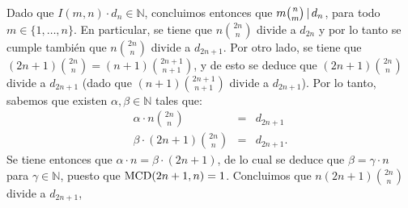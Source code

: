 		Dado que $I(m,n)\cdot d_n\in \mathbb{N}$, concluimos entonces que $m{n\choose m}\hspace{1.8pt}|\hspace{1.8pt}  d_n$, para todo $m \in \{1, \ldots, n\}$.
		En particular, se tiene que $n{2n\choose n}$ divide a $d_{2n}$ y por lo tanto se cumple también que $n{2n\choose n}$ divide a $d_{2n+1}$.
		Por otro lado, se tiene que $(2n+1){2n\choose n}=(n+1){2n+1\choose n+1}$, y de esto se deduce que $(2n+1){2n\choose n}$ divide a $ d_{2n+1}$ (dado que $(n+1){2n+1\choose n+1}$ divide a $d_{2n+1}$). Por lo tanto, sabemos que existen $\alpha, \beta \in \mathbb{N}$ tales que:
		\begin{eqnarray*}
		\alpha \cdot n{2n\choose n} & = & d_{2n+1}\\
		\beta \cdot (2n+1){2n\choose n} & = & d_{2n+1}.
		\end{eqnarray*}
Se tiene entonces que $\alpha \cdot n = \beta \cdot (2n+1)$, de lo cual se deduce que $\beta = \gamma \cdot n$ para $\gamma \in \mathbb{N}$, puesto que ${\rm MCD}(2n+1,n)=1$. Concluimos que $n(2n+1){2n\choose n}$ divide a $d_{2n+1}$,

